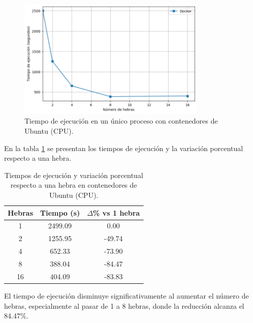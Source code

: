 \begin{figure}[H]
    \centering
    \includegraphics[width=0.8\textwidth]{imagenes/cap5/single-node_ubuntu_docker_time.png}
    \caption{Tiempo de ejecución en un único proceso con contenedores de Ubuntu (CPU).}
    \label{fig:single-node_ubuntu_docker_time}
\end{figure}

En la tabla \ref{tab:single-node_ubuntu_docker} se presentan los tiempos de ejecución y la variación porcentual respecto a una hebra.

\begin{table}[ht]
    \centering
    \begin{tabular}{|c|c|c|}
        \hline
        \textbf{Hebras} & \textbf{Tiempo (s)} & \textbf{$\Delta$\% vs 1 hebra} \\
        \hline
        1               & 2499.09             & 0.00                           \\
        2               & 1255.95             & -49.74                         \\
        4               & 652.33              & -73.90                         \\
        8               & 388.04              & -84.47                         \\
        16              & 404.09              & -83.83                         \\
        \hline
    \end{tabular}
    \caption{Tiempos de ejecución y variación porcentual respecto a una hebra en contenedores de Ubuntu (CPU).}
    \label{tab:single-node_ubuntu_docker}
\end{table}

El tiempo de ejecución disminuye significativamente al aumentar el número de hebras, especialmente al pasar de 1 a 8 hebras, donde la reducción alcanza el 84.47\%.

